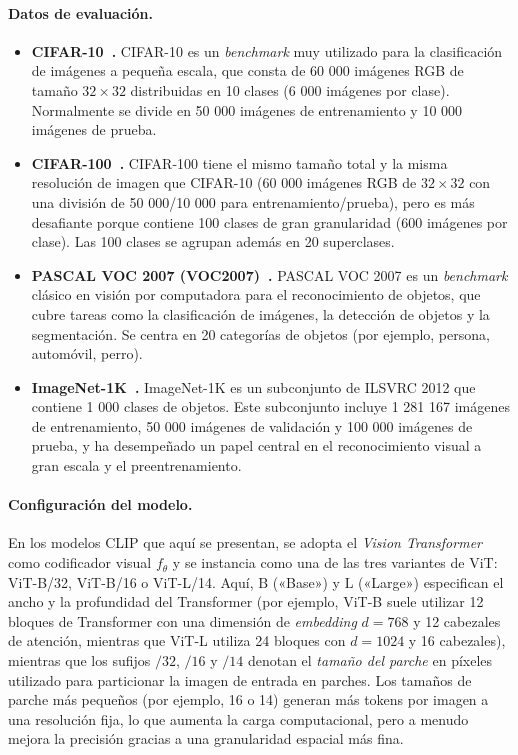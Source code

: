 \documentclass[../../book-main_es.tex]{subfiles}
\begin{document}
\paragraph{Datos de evaluación.}
\begin{itemize}
    \item \textbf{CIFAR-10~\citep{krizhevsky2009learning}.}
    CIFAR-10 es un \textit{benchmark} muy utilizado para la clasificación de imágenes a pequeña escala, 
    que consta de 60 000 imágenes RGB de tamaño \(32\times 32\) distribuidas en 10 clases (6 000 imágenes por clase).
    Normalmente se divide en 50 000 imágenes de entrenamiento y 10 000 imágenes de prueba.

    \item \textbf{CIFAR-100~\citep{krizhevsky2009learning}.}
    CIFAR-100 tiene el mismo tamaño total y la misma resolución de imagen que CIFAR-10 (60 000 imágenes RGB de \(32\times 32\) con una división de 50 000/10 000 para entrenamiento/prueba), pero es más desafiante porque contiene 100 clases de gran granularidad (600 imágenes por clase).
    Las 100 clases se agrupan además en 20 superclases.

    \item \textbf{PASCAL VOC 2007 (VOC2007)~\citep{everingham2010pascal}.}
    PASCAL VOC 2007 es un \textit{benchmark} clásico en visión por computadora para el reconocimiento de objetos, que cubre tareas como la clasificación de imágenes, la detección de objetos y la segmentación.
    Se centra en 20 categorías de objetos (por ejemplo, persona, automóvil, perro).

    \item \textbf{ImageNet-1K~\citep{imagenet_cvpr09}.}
    ImageNet-1K es un subconjunto de ILSVRC 2012 que contiene 1 000 clases de objetos.
    Este subconjunto incluye 1 281 167 imágenes de entrenamiento, 50 000 imágenes de validación 
    y 100 000 imágenes de prueba, y ha desempeñado un papel central en el reconocimiento visual 
    a gran escala y el preentrenamiento.
\end{itemize}

\paragraph{Configuración del modelo.}
En los modelos CLIP que aquí se presentan, se adopta el \textit{Vision Transformer} como codificador visual 
\(f_{\theta}\) y se instancia como una de las tres variantes de ViT: ViT-B/32, ViT-B/16 o ViT-L/14. 
Aquí, \(\text{B}\) («Base») y \(\text{L}\) («Large») especifican el ancho y la profundidad del 
Transformer (por ejemplo, ViT-B suele utilizar 12 bloques de Transformer con una dimensión de 
\textit{embedding} \(d=768\) y 12 cabezales de atención, mientras que ViT-L utiliza 24 bloques con 
\(d=1024\) y 16 cabezales), mientras que los sufijos \(/32\), \(/16\) y \(/14\) denotan el 
\emph{tamaño del parche} en píxeles utilizado para particionar la imagen de entrada en parches. Los tamaños 
de parche más pequeños (por ejemplo, 16 o 14) generan más tokens por imagen a una resolución fija, 
lo que aumenta la carga computacional, pero a menudo mejora la precisión gracias a una granularidad 
espacial más fina.
\end{document}
